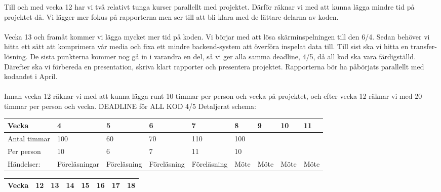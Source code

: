 Till och med vecka 12 har vi två relativt tunga kurser parallellt med projektet. Därför räknar vi med att kunna lägga mindre tid på projektet då. Vi lägger mer fokus på rapporterna men ser till att bli klara med de lättare delarna av koden. 
\\\\
Vecka 13 och framåt kommer vi lägga mycket mer tid på koden. Vi börjar med att lösa skärminspelningen till den 6/4. Sedan behöver vi hitta ett sätt att komprimera vår media och fixa ett mindre backend-system att överföra inspelat data till. Till sist ska vi hitta en transfer-lösning. De sista punkterna kommer nog gå in i varandra en del, så vi ger alla samma deadline, 4/5, då all kod ska vara färdigställd. 
Därefter ska vi förbereda en presentation, skriva klart rapporter och presentera projektet. Rapporterna bör ha påbörjats parallellt med kodandet i April.
\\\\
Innan vecka 12 räknar vi med att kunna lägga runt 10 timmar per person och vecka på projektet, och efter vecka 12 räknar vi med 20 timmar per person och vecka.
DEADLINE för ALL KOD 4/5
Detaljerat schema: 

\begin{center}
    \begin{tabular}{ | l | l | l | l | l | l | l | l | l |}
    \hline
    Vecka & 4 & 5 & 6 & 7 & 8 & 9 & 10 & 11  \\ \hline
    Antal timmar & 100 & 60 & 70 & 110 & 100 &  &  &   \\ \hline
    Per person & 10 & 6 & 7 & 11 & 10 &  &  &   \\ \hline
    Händelser: & Föreläsningar & Föreläsning & Föreläsning & Föreläsning & Möte & Möte & Möte & Möte \\ \hline
    \end{tabular}
\end{center}

\begin{center}
    \begin{tabular}{ | l | l | l | l | l | l | l | l |}
    \hline
    Vecka & 12 & 13 & 14 & 15 & 16 & 17 & 18  \\ \hline
    \end{tabular}
\end{center}